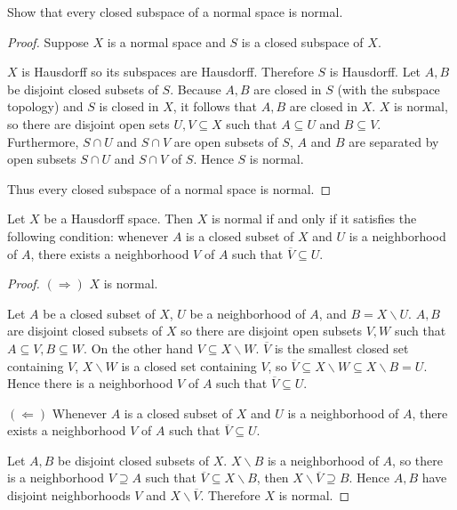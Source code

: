 \begin{exercise}{4.79}
	Show that every closed subspace of a normal space is normal.
\end{exercise}

\begin{proof}
	Suppose $X$ is a normal space and $S$ is a closed subspace of $X$.

	$X$ is Hausdorff so its subspaces are Hausdorff. Therefore $S$ is Hausdorff. Let $A, B$ be disjoint closed subsets of $S$. Because $A, B$ are closed in $S$ (with the subspace topology) and $S$ is closed in $X$, it follows that $A, B$ are closed in $X$. $X$ is normal, so there are disjoint open sets $U, V\subseteq X$ such that $A\subseteq U$ and $B\subseteq V$. Furthermore, $S\cap U$ and $S\cap V$ are open subsets of $S$, $A$ and $B$ are separated by open subsets $S\cap U$ and $S\cap V$ of $S$. Hence $S$ is normal.

	Thus every closed subspace of a normal space is normal.
\end{proof}

\begin{lemma}{4.80}\label{lemma:4.80}
	Let $X$ be a Hausdorff space. Then $X$ is normal if and only if it satisfies the following condition: whenever $A$ is a closed subset of $X$ and $U$ is a neighborhood of $A$, there exists a neighborhood $V$ of $A$ such that $\overline{V} \subseteq U$.
\end{lemma}

\begin{proof}
	$(\Longrightarrow)$ $X$ is normal.

	Let $A$ be a closed subset of $X$, $U$ be a neighborhood of $A$, and $B = X\smallsetminus U$. $A, B$ are disjoint closed subsets of $X$ so there are disjoint open subsets $V, W$ such that $A \subseteq V, B \subseteq W$. On the other hand $V \subseteq X\smallsetminus W$. $\overline{V}$ is the smallest closed set containing $V$, $X\smallsetminus W$ is a closed set containing $V$, so $\overline{V} \subseteq X\smallsetminus W \subseteq X\smallsetminus B = U$. Hence there is a neighborhood $V$ of $A$ such that $\overline{V} \subseteq U$.

	$(\Longleftarrow)$ Whenever $A$ is a closed subset of $X$ and $U$ is a neighborhood of $A$, there exists a neighborhood $V$ of $A$ such that $\overline{V} \subseteq U$.

	Let $A, B$ be disjoint closed subsets of $X$. $X\smallsetminus B$ is a neighborhood of $A$, so there is a neighborhood $V\supseteq A$ such that $\overline{V} \subseteq X\smallsetminus B$, then $X\smallsetminus \overline{V} \supseteq B$. Hence $A, B$ have disjoint neighborhoods $V$ and $X\smallsetminus \overline{V}$. Therefore $X$ is normal.
\end{proof}

